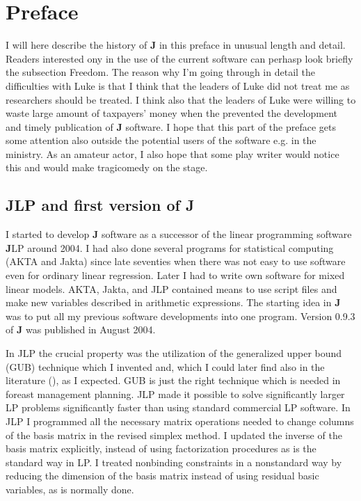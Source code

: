 \section{Preface}
\label{preface1}
I will here describe the history of \textbf{J} in this preface in unusual
length and detail. Readers interested ony in the use of the current
software can perhasp look briefly the subsection Freedom. The reason
why I'm going through in detail
the difficulties with Luke is that I think that the leaders of Luke did not
treat me as researchers should be treated. I think also that the leaders of Luke
were willing to waste large amount of taxpayers' money when the prevented the
development and timely publication of \textbf{J} software. I hope that this part of the
preface gets some attention also outside the potential users of the software e.g.
in the ministry. As an amateur actor, I also hope that some play writer would
notice this and would make tragicomedy on the stage.
\subsection{JLP and first version of \textbf{J}}
\label{preface2}

I started to develop \textbf{J} software as a successor of the linear programming software
\textbf{J}LP \cite{JLP} around
2004. I had also done several programs for statistical computing (AKTA and Jakta)
since late seventies
when there was not
easy to use software even for ordinary linear regression.
Later I had to write own software
for mixed linear models. AKTA, Jakta, and JLP contained  means to use script files and
make new variables described in arithmetic expressions. The starting idea in \textbf{J} was to put all my
previous software developments into one program.
Version 0.9.3 of \textbf{J} was published in August 2004.

In JLP the crucial property was the utilization of the generalized upper bound (GUB) technique which
I invented and, which I could later find also in the literature (\cite{dant}), as I expected. GUB is
just the right technique which is
needed in foreast management planning. JLP made it possible to solve
significantly larger LP problems significantly faster
than using standard commercial LP software. In JLP I programmed all the necessary matrix
operations needed to change columns of the basis matrix in the revised simplex method.
I updated the inverse of the basis matrix explicitly,
instead of using factorization procedures as is the standard way in LP.
I treated nonbinding constraints in a nonstandard way
by reducing the dimension of the basis matrix instead of using residual
basic variables, as is normally done.

